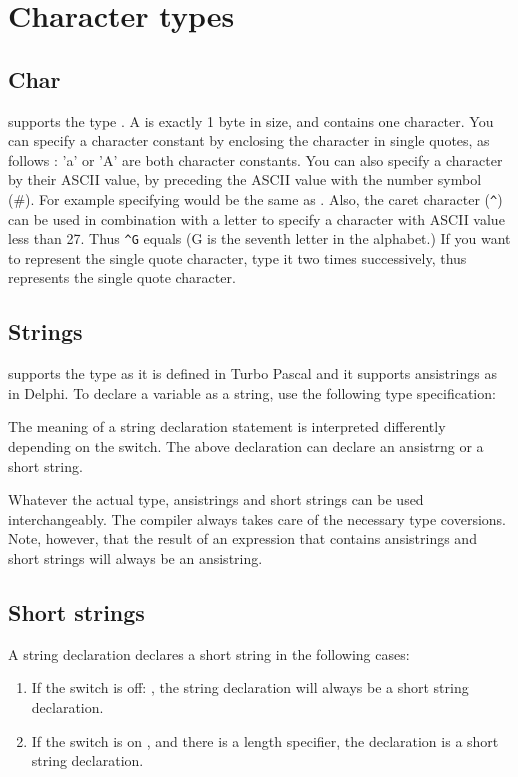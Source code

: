 \documentclass{report}
\begin{document}
\section{Character types}
\subsection{Char}
\fpc supports the type . A  is exactly 1 byte in
size, and contains one character.
You can specify a character constant by enclosing the character in single
quotes, as follows : 'a' or 'A' are both character constants.
You can also specify a character by their ASCII
value, by preceding the ASCII value with the number symbol (\#). For example
specifying  would be the same as .
Also, the caret character (\verb+^+) can be used in combination with a letter to
specify a character with ASCII value less than 27. Thus \verb+^G+ equals
 (G is the seventh letter in the alphabet.)
If you want to represent the single quote character, type it two times
successively, thus  represents the single quote character.

\subsection{Strings}
\fpc supports the  type as it is defined in Turbo Pascal and
it supports ansistrings as in Delphi.
To declare a variable as a string, use the following type specification:


The meaning of a string declaration statement is interpreted differently
depending on the  switch. The above declaration can declare an
ansistrng or a short string.

Whatever the actual type, ansistrings and short strings can be used
interchangeably. The compiler always takes care of the necessary type
coversions. Note, however, that the result of an expression that contains
ansistrings and short strings will always be an ansistring.

\subsection{Short strings}

A string declaration declares a short string in the following cases:

\begin{enumerate}
\item If the switch is off: , the string declaration
will always be a short string declaration.
\item If the switch is on , and there is a length
specifier, the declaration is a short string declaration.
\end{enumerate}
\end{document}
